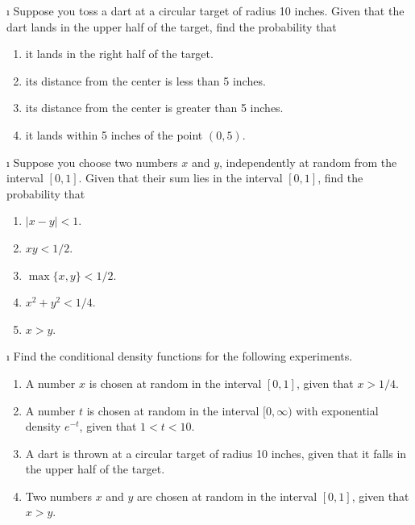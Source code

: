 \begin{LJSItem}
\i\label{exer 4.2.4} Suppose you toss a dart at a circular target of radius 10 inches.  Given
that the dart lands in the upper half of the target, find the probability that
\begin{enumerate}
\item it lands in the right half of the target.

\item its distance from the center is less than 5 inches.

\item its distance from the center is greater than 5 inches.

\item it lands within 5 inches of the point $(0,5)$.
\end{enumerate}

\i\label{exer 4.2.5} Suppose you choose two numbers $x$ and $y$, independently at random from
the interval $[0,1]$.  Given that their sum lies in the interval $[0,1]$,
find the probability that
\begin{enumerate}
\item $|x - y| < 1$.

\item $xy < 1/2$.

\item $\max\{x,y\} < 1/2$.

\item $x^2 + y^2 < 1/4$.

\item $x > y$.
\end{enumerate}

\i\label{exer 4.2.6} Find the conditional density functions for the following experiments.
\begin{enumerate}
\item A number $x$ is chosen at random in the interval $[0,1]$, given that
$x > 1/4$.

\item A number $t$ is chosen at random in the interval $[0,\infty)$ with
exponential density $e^{-t}$, given that $1 < t < 10$.

\item A dart is thrown at a circular target of radius 10 inches, given that
it falls in the upper half of the target.

\item Two numbers $x$ and $y$ are chosen at random in the interval
$[0,1]$, given that $x > y$.
\end{enumerate}


\end{LJSItem}
